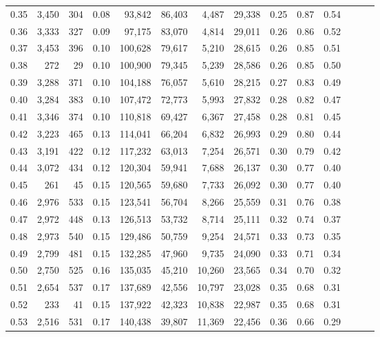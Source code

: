 \begin{tabular}{rrrrrrrrrrrrrr}
0.35 &  3,450 &    304 &  0.08 &   93,842 &   86,403 &   4,487 &  29,338 &  0.25 &  0.87 &      0.54 \\
0.36 &  3,333 &    327 &  0.09 &   97,175 &   83,070 &   4,814 &  29,011 &  0.26 &  0.86 &      0.52 \\
0.37 &  3,453 &    396 &  0.10 &  100,628 &   79,617 &   5,210 &  28,615 &  0.26 &  0.85 &      0.51 \\
0.38 &    272 &     29 &  0.10 &  100,900 &   79,345 &   5,239 &  28,586 &  0.26 &  0.85 &      0.50 \\
0.39 &  3,288 &    371 &  0.10 &  104,188 &   76,057 &   5,610 &  28,215 &  0.27 &  0.83 &      0.49 \\
0.40 &  3,284 &    383 &  0.10 &  107,472 &   72,773 &   5,993 &  27,832 &  0.28 &  0.82 &      0.47 \\
0.41 &  3,346 &    374 &  0.10 &  110,818 &   69,427 &   6,367 &  27,458 &  0.28 &  0.81 &      0.45 \\
0.42 &  3,223 &    465 &  0.13 &  114,041 &   66,204 &   6,832 &  26,993 &  0.29 &  0.80 &      0.44 \\
0.43 &  3,191 &    422 &  0.12 &  117,232 &   63,013 &   7,254 &  26,571 &  0.30 &  0.79 &      0.42 \\
0.44 &  3,072 &    434 &  0.12 &  120,304 &   59,941 &   7,688 &  26,137 &  0.30 &  0.77 &      0.40 \\
0.45 &    261 &     45 &  0.15 &  120,565 &   59,680 &   7,733 &  26,092 &  0.30 &  0.77 &      0.40 \\
0.46 &  2,976 &    533 &  0.15 &  123,541 &   56,704 &   8,266 &  25,559 &  0.31 &  0.76 &      0.38 \\
0.47 &  2,972 &    448 &  0.13 &  126,513 &   53,732 &   8,714 &  25,111 &  0.32 &  0.74 &      0.37 \\
0.48 &  2,973 &    540 &  0.15 &  129,486 &   50,759 &   9,254 &  24,571 &  0.33 &  0.73 &      0.35 \\
0.49 &  2,799 &    481 &  0.15 &  132,285 &   47,960 &   9,735 &  24,090 &  0.33 &  0.71 &      0.34 \\
0.50 &  2,750 &    525 &  0.16 &  135,035 &   45,210 &  10,260 &  23,565 &  0.34 &  0.70 &      0.32 \\
0.51 &  2,654 &    537 &  0.17 &  137,689 &   42,556 &  10,797 &  23,028 &  0.35 &  0.68 &      0.31 \\
0.52 &    233 &     41 &  0.15 &  137,922 &   42,323 &  10,838 &  22,987 &  0.35 &  0.68 &      0.31 \\
0.53 &  2,516 &    531 &  0.17 &  140,438 &   39,807 &  11,369 &  22,456 &  0.36 &  0.66 &      0.29 \\

\end{tabular}
